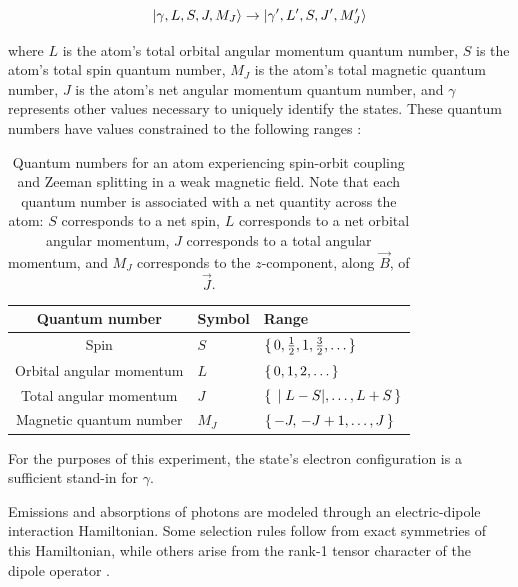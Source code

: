 \documentclass[11pt]{article}
\begin{document}
\begin{equation}
\ket{\gamma, L, S, J, M_J} \rightarrow \ket{\gamma', L', S, J', M_J'}
\label{eq:general_transition}
\end{equation}

where $L$ is the atom's total orbital angular momentum quantum number, $S$ is the atom's total spin quantum number, $M_J$ is the atom's total magnetic quantum number, $J$ is the atom's net angular momentum quantum number, and $\gamma$ represents other values necessary to uniquely identify the states. These quantum numbers have values constrained to the following ranges \cite{griffiths_qm,harris, qmech}:

\begin{table}[H]
\centering
\begin{tabular}{cll}
\hline
\textbf{Quantum number} & \textbf{Symbol} & \textbf{Range} \\
\hline
Spin & $S$
& $\set{0, \tfrac12, 1, \tfrac32, \dots}$ \\

Orbital angular momentum
& $L$
& $\set{0,1,2,\dots}$ \\

Total angular momentum
& $J$
& $\set{|L-S|,\dots,L+S}$ \\

Magnetic quantum number
& $M_J$
& $\set{-J,\,-J+1,\dots,J}$ \\

\hline
\end{tabular}
\caption{Quantum numbers for an atom experiencing spin-orbit coupling and Zeeman splitting in a weak magnetic field. Note that each quantum number is associated with a net quantity across the atom: $S$ corresponds to a net spin, $L$ corresponds to a net orbital angular momentum, $J$ corresponds to a total angular momentum, and $M_J$ corresponds to the $z$-component, along $\vec B$, of $\vec J$.}
\label{tab:quantum_number_values}
\end{table}

For the purposes of this experiment, the state's electron configuration is a sufficient stand-in for $\gamma$. 

Emissions and absorptions of photons are modeled through an electric-dipole interaction Hamiltonian. Some selection rules follow from exact symmetries of this Hamiltonian, while others arise from the rank-1 tensor character of the dipole operator \cite{griffiths_qm, qmech}.
\end{document}
